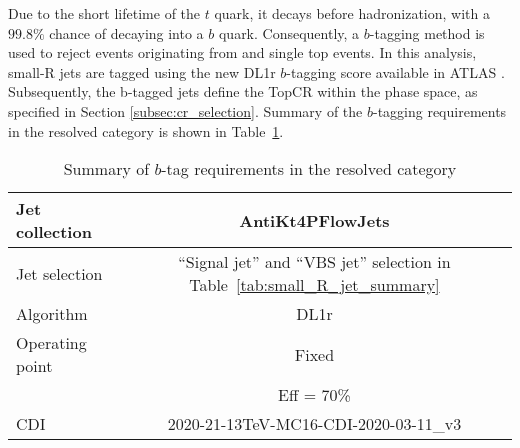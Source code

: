 \label{subsec:flavortagging}

Due to the short lifetime of the $t$ quark, it decays before hadronization, with a $99.8\%$ chance of decaying into a $b$ quark. 
Consequently, a $b$-tagging method is used to reject events originating from \ttbar 
and single top events. 
In this analysis, small-R jets are tagged using the new DL1r $b$-tagging score available in ATLAS \cite{FTAG-2018-01}.
Subsequently, the b-tagged jets define the TopCR within the \olep phase space, as specified in Section \ref{subsec:cr_selection}.
%
%
Summary of the $b$-tagging requirements in the resolved category is shown in Table~\ref{tab:b_tag_resolved}.



\begin{table}[ht]
\begin{center}
\caption{Summary of $b$-tag requirements in the resolved category}
\label{tab:b_tag_resolved}
\begin{tabular}{|l|c|}\hline
Jet collection          & AntiKt4PFlowJets \\\hline
Jet selection           & ``Signal jet'' and ``VBS jet'' selection in Table~\ref{tab:small_R_jet_summary}    \\
                 \hline
Algorithm               & DL1r        \\\hline
Operating point         & Fixed         \\
                     & Eff = 70\%
   \\\hline
CDI                & 2020-21-13TeV-MC16-CDI-2020-03-11\_v3 \\
\hline
\end{tabular}
\end{center}
\end{table}%

